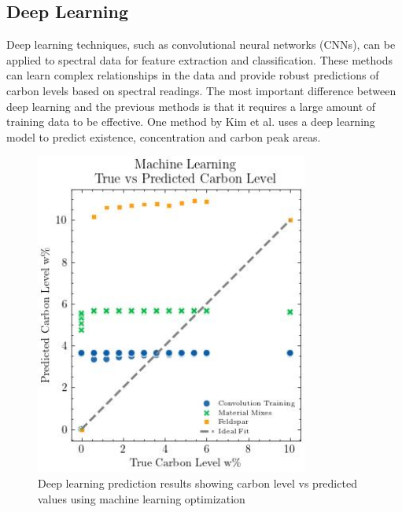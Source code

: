 \subsection{Deep Learning}

Deep learning techniques, such as convolutional neural networks (CNNs), can be applied to spectral data for feature extraction and classification. These methods can learn complex relationships in the data and provide robust predictions of carbon levels based on spectral readings. The most important difference between deep learning and the previous methods is that it requires a large amount of training data to be effective. One method by Kim et al. \cite{kim_deep_2025} uses a deep learning model to predict existence, concentration and carbon peak areas.

\begin{figure}[H]
\centering
\includegraphics[width=0.8\textwidth]{../Figures/Analysis/carbon_level_vs_predicted_ml_optimization.jpg}
\caption{Deep learning prediction results showing carbon level vs predicted values using machine learning optimization}
\label{fig:ml_predictions}
\end{figure}
